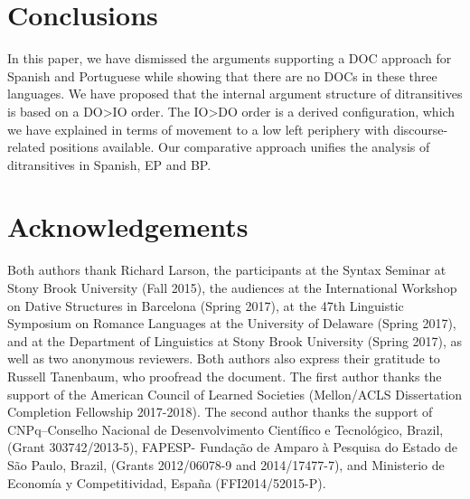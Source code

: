 \documentclass[output=paper,modfonts,nonflat]{langsci/langscibook}
\begin{document}
\section{Conclusions}\label{section4}
In this paper, we have dismissed the arguments supporting a DOC approach for Spanish and Portuguese while showing that there are no DOCs in these three languages. We have proposed that the internal argument structure of ditransitives is based on a DO>IO order. The IO>DO order is a derived configuration, which we have explained in terms of movement to a low left periphery with discourse-related positions available. Our comparative approach unifies the analysis of ditransitives in Spanish, EP and BP.


\section*{Acknowledgements}
Both authors thank Richard Larson, the participants at the Syntax Seminar at Stony Brook University (Fall 2015), the audiences at the International Workshop on Dative Structures in Barcelona (Spring 2017), at the 47th Linguistic Symposium on Romance Languages at the University of Delaware (Spring 2017), and at the Department of Linguistics at Stony Brook University (Spring 2017), as well as two anonymous reviewers. Both authors also express their gratitude to Russell Tanenbaum, who proofread the document. The first author thanks the support of the American Council of Learned Societies (Mellon/ACLS Dissertation Completion Fellowship 2017-2018). The second author thanks the support of CNPq–Conselho Nacional de Desenvolvimento Científico e Tecnológico, Brazil, (Grant 303742/2013-5), FAPESP- Fundação de Amparo à Pesquisa do Estado de São Paulo, Brazil, (Grants 2012/06078-9 and 2014/17477-7), and Ministerio de Economía y Competitividad, España (FFI2014/52015-P).
\end{document}
